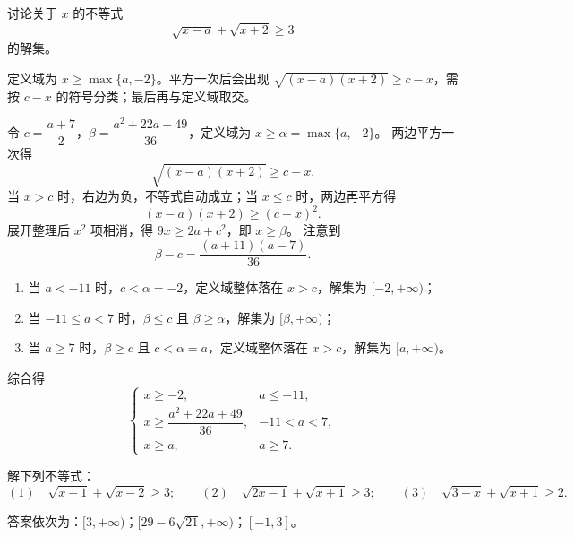 \begin{example}
  讨论关于 \(x\) 的不等式
  \[
  \sqrt{x-a}+\sqrt{x+2}\ge 3
  \]
  的解集。
\end{example}
\begin{analyse}
  定义域为 \(x\ge\max\{a,-2\}\)。平方一次后会出现 \(\sqrt{(x-a)(x+2)}\ge c-x\)，需按 \(c-x\) 的符号分类；最后再与定义域取交。
\end{analyse}
\begin{jie}
  令 \(c=\dfrac{a+7}{2}\)，\(\beta=\dfrac{a^2+22a+49}{36}\)，定义域为 \(x\ge\alpha=\max\{a,-2\}\)。
  两边平方一次得
  \[
  \sqrt{(x-a)(x+2)}\ge c-x.
  \]
  当 \(x>c\) 时，右边为负，不等式自动成立；当 \(x\le c\) 时，两边再平方得
  \[
  (x-a)(x+2)\ge(c-x)^2.
  \]
  展开整理后 \(x^2\) 项相消，得 \(9x\ge 2a+c^2\)，即 \(x\ge\beta\)。
  注意到
  \[
  \beta-c=\frac{(a+11)(a-7)}{36}.
  \]
  \begin{enumerate}
    \item 当 \(a<-11\) 时，\(c<\alpha=-2\)，定义域整体落在 \(x>c\)，解集为 \([-2,+\infty)\)；
    \item 当 \(-11\le a<7\) 时，\(\beta\le c\) 且 \(\beta\ge\alpha\)，解集为 \([\beta,+\infty)\)；
    \item 当 \(a\ge 7\) 时，\(\beta\ge c\) 且 \(c<\alpha=a\)，定义域整体落在 \(x>c\)，解集为 \([a,+\infty)\)。
  \end{enumerate}
  综合得
  \[
  \begin{cases}
    x\ge -2,& a\le -11,\\[2pt]
    x\ge \dfrac{a^2+22a+49}{36},& -11<a<7,\\[2pt]
    x\ge a,& a\ge 7.
  \end{cases}
  \]
\end{jie}

\begin{exercise}
  解下列不等式：
  \[
  (1)\quad \sqrt{x+1}+\sqrt{x-2}\ge 3;\qquad
  (2)\quad \sqrt{2x-1}+\sqrt{x+1}\ge 3;\qquad
  (3)\quad \sqrt{3-x}+\sqrt{x+1}\ge 2.
  \]
\end{exercise}
\begin{hint}
  答案依次为：\([3,+\infty)\)；\([29-6\sqrt{21},+\infty)\)；\([-1,3]\)。
\end{hint}

\clearpage
